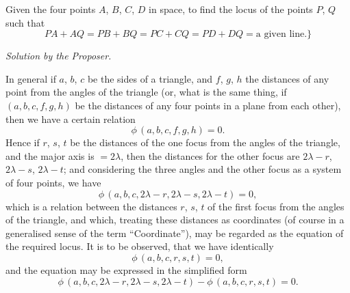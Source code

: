 \documentclass[11pt,a4paper]{article}
\begin{document}
Given the four points $A$, $B$, $C$, $D$ in space, to find the locus of the points $P$, $Q$
such that
\[
PA + AQ = PB + BQ = PC + CQ = PD + DQ = \text{a given line.}\}
\]

\begin{center}
\textit{Solution by the Proposer.}
\end{center}

In general if $a$, $b$, $c$ be the sides of a triangle, and $f$, $g$, $h$ the distances of any
point from the angles of the triangle (or, what is the same thing, if $(a, b, c, f, g, h)$
be the distances of any four points in a plane from each other), then we have a certain
relation
\[
\phi\,(a, b, c, f, g, h) = 0.
\]
Hence if $r$, $s$, $t$ be the distances of the one focus from the angles of the triangle, and
the major axis is $=2\lambda$, then the distances for the other focus are $2\lambda-r$, $2\lambda-s$, $2\lambda-t$;
and considering the three angles and the other focus as a system of four points, we
have
\[
\phi\,(a, b, c, 2\lambda-r, 2\lambda-s, 2\lambda-t) = 0,
\]
which is a relation between the distances $r$, $s$, $t$ of the first focus from the angles of
the triangle, and which, treating these distances as coordinates (of course in a generalised
sense of the term ``Coordinate''), may be regarded as the equation of the required
locus. It is to be observed, that we have identically
\[
\phi\,(a, b, c, r, s, t) = 0,
\]
and the equation may be expressed in the simplified form
\[
\phi\,(a, b, c, 2\lambda-r, 2\lambda-s, 2\lambda-t) - \phi\,(a, b, c, r, s, t) = 0.
\]
\end{document}
